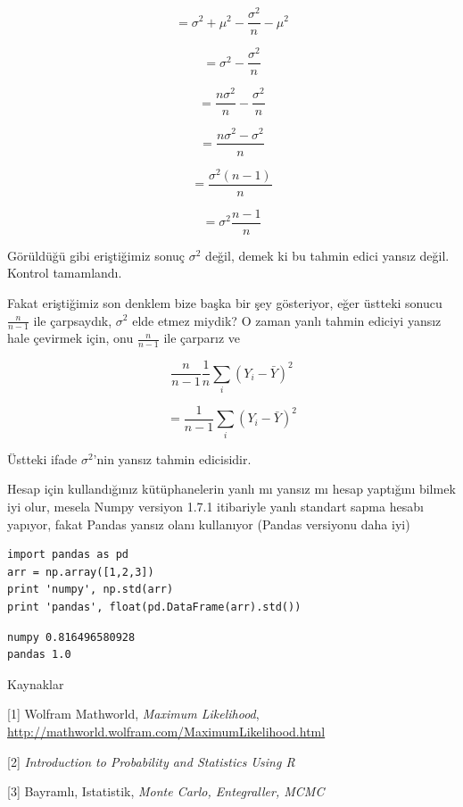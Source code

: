 \documentclass[12pt,fleqn]{article}\usepackage{../../common}
\begin{document}
$$ 
=  \sigma^2 + \mu^2 -\frac{\sigma^2}{n} - \mu^2 
$$

$$ 
=  \sigma^2 -\frac{\sigma^2}{n} 
$$

$$ 
=  \frac{n\sigma^2}{n} -\frac{\sigma^2}{n} 
$$


$$ 
=  \frac{n\sigma^2 - \sigma^2}{n} 
$$

$$ 
=  \frac{\sigma^2(n-1)}{n} 
$$

$$ = \sigma^2 \frac{n-1}{n} $$

Görüldüğü gibi eriştiğimiz sonuç $\sigma^2$ değil, demek ki bu tahmin edici
yansız değil. Kontrol tamamlandı.

Fakat eriştiğimiz son denklem bize başka bir şey gösteriyor, eğer üstteki
sonucu $\frac{n}{n-1}$ ile çarpsaydık, $\sigma^2$ elde etmez miydik? O
zaman yanlı tahmin ediciyi yansız hale çevirmek için, onu $\frac{n}{n-1}$
ile çarparız ve

$$ \frac{n}{n-1} \frac{1}{n}\sum_i (Y_i-\bar{Y})^2 $$

$$ =  \frac{1}{n-1}\sum_i (Y_i-\bar{Y})^2 $$

Üstteki ifade $\sigma^2$'nin yansız tahmin edicisidir. 

Hesap için kullandığınız kütüphanelerin yanlı mı yansız mı hesap yaptığını
bilmek iyi olur, mesela Numpy versiyon 1.7.1 itibariyle yanlı standart
sapma hesabı yapıyor, fakat Pandas yansız olanı kullanıyor (Pandas
versiyonu daha iyi)

\begin{verbatim}
import pandas as pd
arr = np.array([1,2,3])
print 'numpy', np.std(arr)
print 'pandas', float(pd.DataFrame(arr).std())
\end{verbatim}

\begin{verbatim}
numpy 0.816496580928
pandas 1.0
\end{verbatim}

Kaynaklar

[1] Wolfram Mathworld, {\em Maximum Likelihood}, \url{http://mathworld.wolfram.com/MaximumLikelihood.html}

[2] {\em Introduction to Probability and Statistics Using R}

[3] Bayramlı, Istatistik, {\em Monte Carlo, Entegraller, MCMC}
\end{document}
